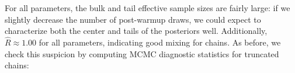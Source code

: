 \documentclass[
]{article}
\newenvironment{Shaded}{\begin{snugshade}}{\end{snugshade}}
\newcommand{\AttributeTok}[1]{\textcolor[rgb]{0.13,0.29,0.53}{#1}}
\newcommand{\CommentTok}[1]{\textcolor[rgb]{0.56,0.35,0.01}{\textit{#1}}}
\newcommand{\ControlFlowTok}[1]{\textcolor[rgb]{0.13,0.29,0.53}{\textbf{#1}}}
\newcommand{\DecValTok}[1]{\textcolor[rgb]{0.00,0.00,0.81}{#1}}
\newcommand{\FunctionTok}[1]{\textcolor[rgb]{0.13,0.29,0.53}{\textbf{#1}}}
\newcommand{\NormalTok}[1]{#1}
\newcommand{\OtherTok}[1]{\textcolor[rgb]{0.56,0.35,0.01}{#1}}
\newcommand{\SpecialCharTok}[1]{\textcolor[rgb]{0.81,0.36,0.00}{\textbf{#1}}}
\begin{document}
\linespread{1}

For all parameters, the bulk and tail effective sample sizes are fairly large: if we slightly decrease the number of post-warmup draws, we could expect to characterize both the center and tails of the posteriors well. Additionally, \(\hat{R} \approx 1.00\) for all parameters, indicating good mixing for chains. As before, we check this suspicion by computing MCMC diagnostic statistics for truncated chains:

\linespread{1}

\begin{Shaded}
\end{Shaded}
\end{document}
